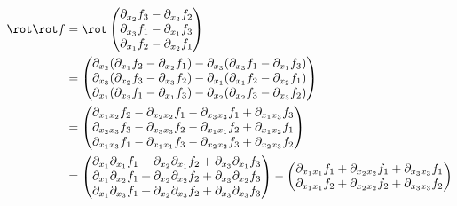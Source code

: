 \begin{solution}
\begin{enumerate}[label = (\roman*)]
    \begin{align*}
        \rot \rot f
        & =
        \rot
        \begin{pmatrix}
            \partial_{x_2} f_3 - \partial_{x_3} f_2 \\
            \partial_{x_3} f_1 - \partial_{x_1} f_3 \\
            \partial_{x_1} f_2 - \partial_{x_2} f_1
        \end{pmatrix} \\
        & =
        \begin{pmatrix}
            \partial_{x_2} (\partial_{x_1} f_2 - \partial_{x_2} f_1) - \partial_{x_3} (\partial_{x_3} f_1 - \partial_{x_1} f_3) \\
            \partial_{x_3} (\partial_{x_2} f_3 - \partial_{x_3} f_2) - \partial_{x_1} (\partial_{x_1} f_2 - \partial_{x_2} f_1) \\
            \partial_{x_1} (\partial_{x_3} f_1 - \partial_{x_1} f_3) - \partial_{x_2} (\partial_{x_2} f_3 - \partial_{x_3} f_2)
        \end{pmatrix} \\
        & =
        \begin{pmatrix}
            \partial_{x_1 x_2} f_2 - \partial_{x_2 x_2} f_1 - \partial_{x_3 x_3} f_1 + \partial_{x_1 x_3} f_3 \\
            \partial_{x_2 x_3} f_3 - \partial_{x_3 x_3} f_2 - \partial_{x_1 x_1} f_2 + \partial_{x_1 x_2} f_1 \\
            \partial_{x_1 x_3} f_1 - \partial_{x_1 x_1} f_3 - \partial_{x_2 x_2} f_3 + \partial_{x_2 x_3} f_2
        \end{pmatrix} \\
        & =
        \begin{pmatrix}
            \partial_{x_1} \partial_{x_1} f_1 + \partial_{x_2} \partial_{x_1} f_2 + \partial_{x_3} \partial_{x_1} f_3 \\
            \partial_{x_1} \partial_{x_2} f_1 + \partial_{x_2} \partial_{x_2} f_2 + \partial_{x_3} \partial_{x_2} f_3 \\
            \partial_{x_1} \partial_{x_3} f_1 + \partial_{x_2} \partial_{x_3} f_2 + \partial_{x_3} \partial_{x_3} f_3
        \end{pmatrix}
        -
        \begin{pmatrix}
            \partial_{x_1 x_1} f_1 + \partial_{x_2 x_2} f_1 + \partial_{x_3 x_3} f_1 \\
            \partial_{x_1 x_1} f_2 + \partial_{x_2 x_2} f_2 + \partial_{x_3 x_3} f_2 \\

\end{pmatrix}
\end{align*}
\end{enumerate}
\end{solution}
